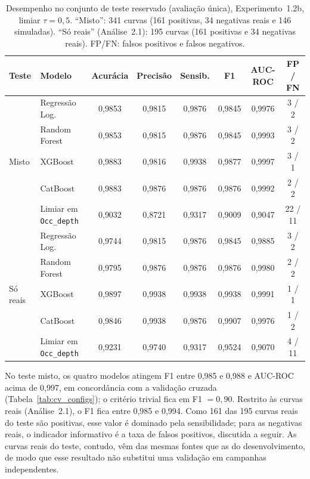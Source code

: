\begin{table}[htbp]
\centering
\caption{Desempenho no conjunto de teste reservado (avaliação única), Experimento~1.2b, limiar $\tau = 0{,}5$. ``Misto'': 341 curvas (161 positivas, 34 negativas reais e 146 simuladas). ``Só reais'' (Análise~2.1): 195 curvas (161 positivas e 34 negativas reais). FP/FN: falsos positivos e falsos negativos.}
\label{tab:teste_final}
\label{tab:metricas_7}
\footnotesize
\setlength{\tabcolsep}{4pt}
\begin{tabular}{llcccccc}
\hline
\textbf{Teste} & \textbf{Modelo} & \textbf{Acurácia} & \textbf{Precisão} & \textbf{Sensib.} & \textbf{F1} & \textbf{AUC-ROC} & \textbf{FP / FN} \\
\hline
\multirow{5}{*}{Misto} & Regressão Log. & 0{,}9853 & 0{,}9815 & 0{,}9876 & 0{,}9845 & 0{,}9976 & 3 / 2 \\
 & Random Forest & 0{,}9853 & 0{,}9815 & 0{,}9876 & 0{,}9845 & 0{,}9993 & 3 / 2 \\
 & XGBoost & 0{,}9883 & 0{,}9816 & 0{,}9938 & 0{,}9877 & 0{,}9997 & 3 / 1 \\
 & CatBoost & 0{,}9883 & 0{,}9876 & 0{,}9876 & 0{,}9876 & 0{,}9992 & 2 / 2 \\
 & Limiar em \texttt{Occ\_depth} & 0{,}9032 & 0{,}8721 & 0{,}9317 & 0{,}9009 & 0{,}9047 & 22 / 11 \\
\hline
\multirow{5}{*}{Só reais} & Regressão Log. & 0{,}9744 & 0{,}9815 & 0{,}9876 & 0{,}9845 & 0{,}9885 & 3 / 2 \\
 & Random Forest & 0{,}9795 & 0{,}9876 & 0{,}9876 & 0{,}9876 & 0{,}9980 & 2 / 2 \\
 & XGBoost & 0{,}9897 & 0{,}9938 & 0{,}9938 & 0{,}9938 & 0{,}9991 & 1 / 1 \\
 & CatBoost & 0{,}9846 & 0{,}9938 & 0{,}9876 & 0{,}9907 & 0{,}9976 & 1 / 2 \\
 & Limiar em \texttt{Occ\_depth} & 0{,}9231 & 0{,}9740 & 0{,}9317 & 0{,}9524 & 0{,}9070 & 4 / 11 \\
\hline
\end{tabular}
\end{table}

No teste misto, os quatro modelos atingem F1 entre 0,985 e 0,988 e AUC-ROC acima de 0,997, em concordância com a validação cruzada (Tabela~\ref{tab:cv_configs}); o critério trivial fica em F1 $= 0{,}90$. Restrito às curvas reais (Análise~2.1), o F1 fica entre 0,985 e 0,994. Como 161 das 195 curvas reais do teste são positivas, esse valor é dominado pela sensibilidade; para as negativas reais, o indicador informativo é a taxa de falsos positivos, discutida a seguir. As curvas reais do teste, contudo, vêm das mesmas fontes que as do desenvolvimento, de modo que esse resultado não substitui uma validação em campanhas independentes.


